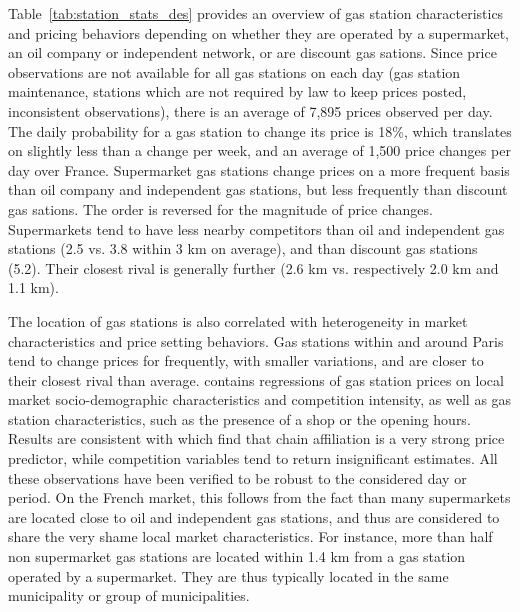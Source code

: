 \documentclass[english]{article}
\begin{document}
Table~\ref{tab:station_stats_des} provides an overview of gas station characteristics and pricing behaviors depending on whether they are operated by a supermarket, an oil company or independent network, or are discount gas sations. Since price observations are not available for all gas stations on each day (gas station maintenance, stations which are not required by law to keep prices posted, inconsistent observations), there is an average of 7,895 prices observed per day. The daily probability for a gas station to change its price is 18\%, which translates on slightly less than a change per week, and an average of 1,500 price changes per day over France. Supermarket gas stations change prices on a more frequent basis than oil company and independent gas stations, but less frequently than discount gas sations. The order is reversed for the magnitude of price changes. Supermarkets tend to have less nearby competitors than oil and independent gas stations (2.5 vs. 3.8 within 3 km on average), and than discount gas stations (5.2). Their closest rival is generally further (2.6 km vs. respectively 2.0 km and 1.1 km).

The location of gas stations is also correlated with heterogeneity in market characteristics and price setting behaviors. Gas stations within and around Paris tend to change prices for frequently, with smaller variations, and are closer to their closest rival than average. \cite{CHA16} contains regressions of gas station prices on local market socio-demographic characteristics and competition intensity, as well as gas station characteristics, such as the presence of a shop or the opening hours. Results are consistent with \cite{HOS08} which find that chain affiliation is a very strong price predictor, while competition variables tend to return insignificant estimates. All these observations have been verified to be robust to the considered day or period. On the French market, this follows from the fact than many supermarkets are located close to oil and independent gas stations, and thus are considered to share the very shame local market characteristics. For instance, more than half non supermarket gas stations are located within 1.4 km from a gas station operated by a supermarket. They are thus typically located in the same municipality or group of municipalities.
\end{document}
